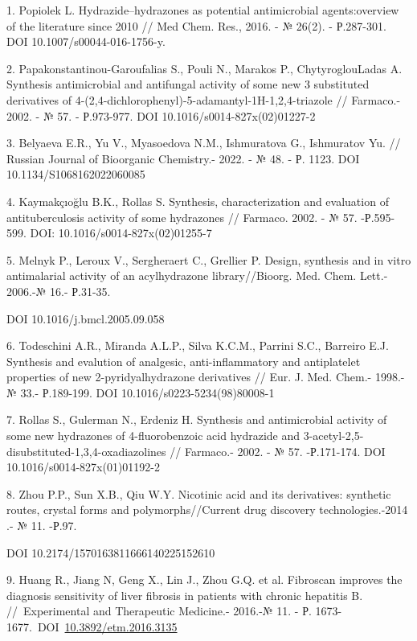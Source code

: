 \begin{references}
1. Popiolek L. Hydrazide--hydrazones as potential antimicrobial
agents:overview of the literature since 2010 // Med Chem. Res., 2016. -
№ 26(2). - Р.287-301. DOI 10.1007/s00044-016-1756-y.

2. Papakonstantinou-Garoufalias S., Pouli N., Marakos P.,
ChytyroglouLadas A. Synthesis antimicrobial and antifungal activity of
some new 3 substituted derivatives of
4-(2,4-dichlorophenyl)-5-adamantyl-1H-1,2,4-triazole // Farmaco.- 2002.
- № 57. - Р.973-977. DOI 10.1016/s0014-827x(02)01227-2

3. Belyaeva E.R., Yu V., Myasoedova N.M., Ishmuratova G., Ishmuratov Yu.
// Russian Journal of Bio\-organic Chemistry.- 2022. - № 48. - Р.
1123. DOI 10.1134/S1068162022060085

4. Kaymakçıoğlu B.K., Rollas S. Synthesis, characterization and
evaluation of antituberculosis activity of some hydrazones // Farmaco.
2002. - № 57. -Р.595-599. DOI: 10.1016/s0014-827x(02)01255-7

5. Melnyk P., Leroux V., Sergheraert C., Grellier P. Design, synthesis
and in vitro antimalarial activity of an acylhydrazone library//Bioorg.
Med. Chem. Lett.- 2006.-№ 16.- Р.31-35.

DOI 10.1016/j.bmcl.2005.09.058

6. Todeschini A.R., Miranda A.L.P., Silva K.C.M., Parrini S.C., Barreiro
E.J. Synthesis and evalution of analgesic, anti-inflammatory and
antiplatelet properties of new 2-pyridyalhydrazone derivatives // Eur.
J. Med. Chem.- 1998.- № 33.- Р.189-199. DOI
10.1016/s0223-5234(98)80008-1

7. Rollas S., Gulerman N., Erdeniz H. Synthesis and antimicrobial
activity of some new hydrazones of 4-fluorobenzoic acid hydrazide and
3-acetyl-2,5-disubstituted-1,3,4-oxadiazolines // Farmaco.- 2002. - №
57. -Р.171-174. DOI 10.1016/s0014-827x(01)01192-2

8. Zhou P.P., Sun X.B., Qiu W.Y. Nicotinic acid and its derivatives:
synthetic routes, crystal forms and polymorphs//Current drug discovery
technologies.-2014 .- № 11. -Р.97.

DOI 10.2174/1570163811666140225152610

9. Huang R., Jiang N, Geng X., Lin J., Zhou G.Q. et al. Fibroscan
improves the diagnosis sensitivity of liver fibrosis in patients with
chronic hepatitis B. //~Experimental and Therapeutic Medicine.- 2016.-№
11. - Р.
1673-1677.~DOI~\href{http://doi.org/10.3892/etm.2016.3135}{10.3892/etm.2016.3135}~


\end{references}
